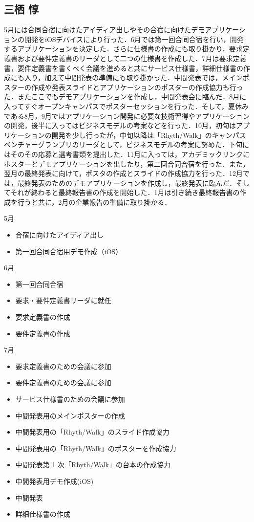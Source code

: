 \subsection{三栖 惇}
\par
5月には合同合宿に向けたアイディア出しやその合宿に向けたデモアプリケーションの開発をiOSデバイスにより行った．6月では第一回合同合宿を行い，開発するアプリケーションを決定した．さらに仕様書の作成にも取り掛かり，要求定義書および要件定義書のリーダとして二つの仕様書を作成した．7月は要求定義書，要件定義書を書くべく会議を進めると共にサービス仕様書，詳細仕様書の作成にも入り，加えて中間発表の準備にも取り掛かった．中間発表では，メインポスターの作成や発表スライドとアプリケーションのポスターの作成協力も行った．またここでもデモアプリケーションを作成し，中間発表会に臨んだ．8月に入ってすぐオープンキャンパスでポスターセッションを行った．そして，夏休みである8月，9月ではアプリケーション開発に必要な技術習得やアプリケーションの開発，後半に入ってはビジネスモデルの考案などを行った．10月，初旬はアプリケーションの開発を少し行ったが，中旬以降は「Rhyth/Walk」のキャンパスベンチャーグランプリのリーダとして，ビジネスモデルの考案に努めた．下旬にはそのその応募と選考書類を提出した．11月に入っては，アカデミックリンクにポスターとデモアプリケーションを出したり，第二回合同合宿を行った．また，翌月の最終発表に向けて，ポスタの作成とスライドの作成協力を行った．12月では，最終発表のためのデモアプリケーションを作成し，最終発表に臨んだ．そしてそれが終わると最終報告書の作成を開始した．1月は引き続き最終報告書の作成を行うと共に，2月の企業報告の準備に取り掛かる．
\par
5月
\begin{itemize}
\item 合宿に向けたアイディア出し
\item 第一回合同合宿用デモ作成（iOS）
\end{itemize}
6月
\begin{itemize}
\item 第一回合同合宿
\item 要求・要件定義書リーダに就任
\item 要求定義書の作成
\item 要件定義書の作成
\end{itemize}
7月
\begin{itemize}
\item 要求定義書のための会議に参加
\item 要件定義書のための会議に参加
\item サービス仕様書のための会議に参加
\item 中間発表用のメインポスターの作成
\item 中間発表用の「Rhyth/Walk」のスライド作成協力
\item 中間発表用の「Rhyth/Walk」のポスターを作成協力
\item 中間発表第 1 次「Rhyth/Walk」の台本の作成協力
\item 中間発表用デモ作成(iOS)
\item 中間発表
\item 詳細仕様書の作成
\end{itemize}
